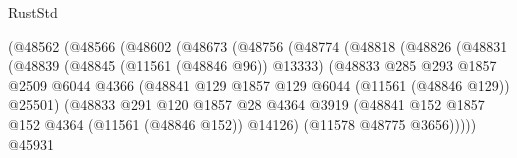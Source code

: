 \begin{lexlean}{RustStd}
\begin{coremodule}
                                    (@48562
                                      (@48566
                                        (@48602
                                          (@48673
                                            (@48756
                                              (@48774
                                                (@48818
                                                  (@48826
                                                    (@48831
                                                      (@48839
                                                        (@48845 (@11561 (@48846 @96)) @13333)
                                                        (@48833
                                                          @285
                                                          @293
                                                          @1857
                                                          @2509
                                                          @6044
                                                          @4366
                                                          (@48841
                                                            @129
                                                            @1857
                                                            @129
                                                            @6044
                                                            (@11561 (@48846 @129))
                                                            @25501)
                                                          (@48833
                                                            @291
                                                            @120
                                                            @1857
                                                            @28
                                                            @4364
                                                            @3919
                                                            (@48841
                                                              @152
                                                              @1857
                                                              @152
                                                              @4364
                                                              (@11561 (@48846 @152))
                                                              @14126)
                                                            (@11578 @48775 @3656)))))
                                                    @45931

\end{coremodule}
\end{lexlean}
